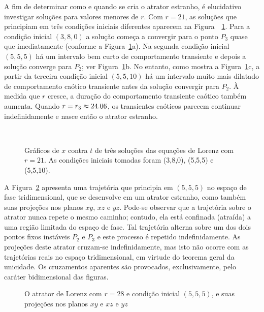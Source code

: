 A fim de determinar como e quando se cria o atrator estranho, é elucidativo investigar soluções para valores menores de $r$. Com $r=21$, as soluções que principiam em três condições iniciais diferentes aparecem na Figura~~\ref{figlorenzxtriplo}. Para a condição inicial $(3,8,0)$ a solução começa a convergir para o ponto $P_{3}$ quase que imediatamente (conforme a Figura~\ref{figlorenzxtriplo}a). Na segunda condição inicial $(5,5,5)$ há um intervalo bem curto de comportamento transiente e depois a solução converge para $P_{2}$; ver Figura~\ref{figlorenzxtriplo}b. No entanto, como mostra a Figura~\ref{figlorenzxtriplo}c, a partir da terceira condição inicial $(5,5,10)$ há um intervalo muito mais dilatado de comportamento caótico transiente antes da solução convergir para $P_{2}$. À medida que $r$ cresce, a duração do comportamento transiente caótico também aumenta. Quando $r=r_{3}\thickapprox24.06$, os transientes caóticos parecem continuar indefinidamente e nasce então o atrator estranho.

\begin{figure}[ht]
\centering 
{}  \\   
\caption{Gráficos de $x$ contra $t$ de três soluções das equações de Lorenz com $r=21$. As condições iniciais tomadas foram (3,8,0), (5,5,5) e (5,5,10).}
\label{figlorenzxtriplo}
\end{figure}

A Figura~\ref{figlorenzatratorproj} apresenta uma trajetória que principia em $(5,5,5)$ no espaço de fase tridimensional, que se desenvolve em um atrator estranho, como também suas projeções nos planos $xy$, $xz$ e $yz$. Pode-se observar que a trajetória sobre o atrator nunca repete o mesmo caminho; contudo, ela está confinada (atraída) a uma região limitada do espaço de fase. Tal trajetória alterna sobre um dos dois pontos fixos instáveis $P_{2}$ e $P_{3}$ e este processo é repetido indefinidamente. As projeções deste atrator cruzam-se indefinidamente, mas isto não ocorre com as trajetórias reais no espaço tridimensional, em virtude do teorema geral da unicidade. Os cruzamentos aparentes são provocados, exclusivamente, pelo caráter bidimensional das figuras.

\begin{figure}[ht]
\centering {} 
\caption{O atrator de Lorenz com $r=28$ e condição inicial $(5,5,5)$, e suas projeções nos planos $xy$ e $xz$ e $yz$}
\label{figlorenzatratorproj}
\end{figure}

